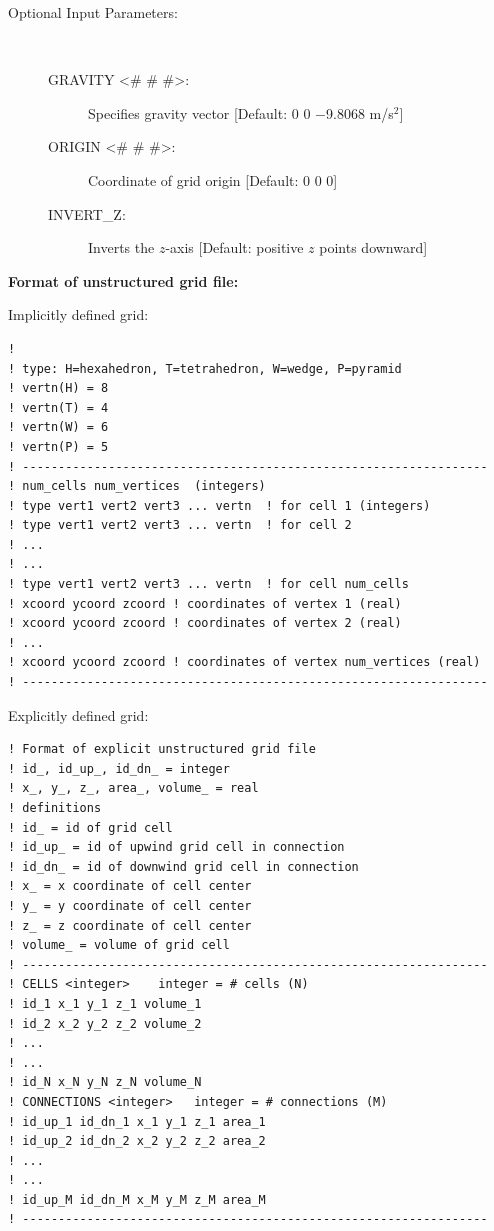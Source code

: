 \documentclass[12pt]{article}
\begin{document}
\begin{description}
\item[Optional Input Parameters:] ~

\begin{description}

\item[GRAVITY <\# \# \#>:] Specifies gravity vector [Default: 0 0 $-$9.8068 m/s$^2$]

\item[ORIGIN <\# \# \#>:] Coordinate of grid origin [Default: 0 0 0]

\item[INVERT\_Z:] Inverts the $z$-axis [Default: positive $z$ points downward]
\end{description}
\end{description}

\begin{mdframed}

\noindent
{\bf Format of unstructured grid file:}

Implicitly defined grid:
\begin{verbatim}
! 
! type: H=hexahedron, T=tetrahedron, W=wedge, P=pyramid
! vertn(H) = 8
! vertn(T) = 4
! vertn(W) = 6
! vertn(P) = 5
! -----------------------------------------------------------------
! num_cells num_vertices  (integers)
! type vert1 vert2 vert3 ... vertn  ! for cell 1 (integers)
! type vert1 vert2 vert3 ... vertn  ! for cell 2
! ...
! ...
! type vert1 vert2 vert3 ... vertn  ! for cell num_cells
! xcoord ycoord zcoord ! coordinates of vertex 1 (real)
! xcoord ycoord zcoord ! coordinates of vertex 2 (real)
! ...
! xcoord ycoord zcoord ! coordinates of vertex num_vertices (real)
! -----------------------------------------------------------------
\end{verbatim}
\end{mdframed}

\begin{mdframed}

Explicitly defined grid:
  
\begin{verbatim}
! Format of explicit unstructured grid file
! id_, id_up_, id_dn_ = integer
! x_, y_, z_, area_, volume_ = real
! definitions
! id_ = id of grid cell
! id_up_ = id of upwind grid cell in connection
! id_dn_ = id of downwind grid cell in connection
! x_ = x coordinate of cell center
! y_ = y coordinate of cell center
! z_ = z coordinate of cell center
! volume_ = volume of grid cell
! -----------------------------------------------------------------
! CELLS <integer>    integer = # cells (N)
! id_1 x_1 y_1 z_1 volume_1
! id_2 x_2 y_2 z_2 volume_2
! ...
! ...
! id_N x_N y_N z_N volume_N
! CONNECTIONS <integer>   integer = # connections (M)
! id_up_1 id_dn_1 x_1 y_1 z_1 area_1
! id_up_2 id_dn_2 x_2 y_2 z_2 area_2
! ...
! ...
! id_up_M id_dn_M x_M y_M z_M area_M
! -----------------------------------------------------------------
\end{verbatim}
\end{mdframed}
\end{document}
